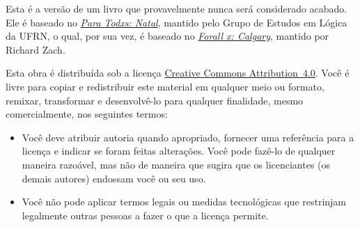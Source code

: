 \parbox{3 in}{
	
Esta é a versão  de um livro que provavelmente nunca será considerado acabado.
Ele é baseado no \href{https://github.com/Grupo-de-Estudos-em-Logica-da-UFRN/Para-Todxs-Natal}{\emph{Para Todxs: Natal}}, mantido pelo Grupo de Estudos em Lógica da UFRN, o qual, por sua vez, é baseado no \href{https://github.com/rzach/forallx-yyc}{\emph{Forall x: Calgary}}, mantido por Richard Zach.

Esta obra é distribuída sob a licença \href{https://creativecommons.org/licenses/by/4.0/}{Creative Commons \hbox{Attribution 4.0}}. 
Você é livre para copiar e redistribuir este material em qualquer meio ou formato, remixar, transformar e desenvolvê-lo para qualquer finalidade, mesmo comercialmente, nos seguintes termos:
\begin{itemize}
\item Você deve atribuir autoria quando apropriado, fornecer uma referência para a licença e indicar se foram feitas alterações. Você pode fazê-lo de qualquer maneira razoável, mas não de maneira que sugira que os licenciantes (os demais autores) endossam você ou seu uso.
\item Você não pode aplicar termos legais ou medidas tecnológicas que restrinjam legalmente outras pessoas a fazer o que a licença permite.
\end{itemize}
	}
\label{cc4by}

